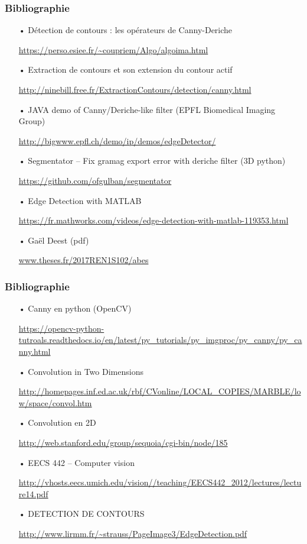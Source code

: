 \documentclass{beamer}
\begin{document}
\begin{frame}
\frametitle{Bibliographie}
	
\begin{itemize}
\item[•] Détection de contours : les opérateurs de Canny-Deriche
\item[] \url{https://perso.esiee.fr/~coupriem/Algo/algoima.html} 

\item[•] Extraction de contours et son extension du contour actif
\item[]
\url{http://ninebill.free.fr/ExtractionContours/detection/canny.html}

\item[•] JAVA demo of Canny/Deriche-like filter (EPFL Biomedical Imaging Group)
\item[] \url{http://bigwww.epfl.ch/demo/ip/demos/edgeDetector/} 

\item[•] Segmentator \--- Fix gramag export error with deriche filter (3D python)
\item[] \url{https://github.com/ofgulban/segmentator} 

\item[•] Edge Detection with MATLAB
\item[] \url{https://fr.mathworks.com/videos/edge-detection-with-matlab-119353.html} 

\item[•] Gaël Deest (pdf)
\item[] \url{www.theses.fr/2017REN1S102/abes} 
\end{itemize}
\end{frame}

\begin{frame}
\frametitle{Bibliographie}
	
\begin{itemize}

\item[•] Canny en python (OpenCV)
\item[] \url{https://opencv-python-tutroals.readthedocs.io/en/latest/py_tutorials/py_imgproc/py_canny/py_canny.html} 

\item[•] Convolution in Two Dimensions
\item[] \url{http://homepages.inf.ed.ac.uk/rbf/CVonline/LOCAL_COPIES/MARBLE/low/space/convol.htm} 

\item[•] Convolution en 2D
\item[] \url{http://web.stanford.edu/group/sequoia/cgi-bin/node/185} 

\item[•] EECS 442 \--- Computer vision
\item[] \url{http://vhosts.eecs.umich.edu/vision//teaching/EECS442_2012/lectures/lecture14.pdf} 

\item[•] DETECTION DE CONTOURS
\item[] \url{http://www.lirmm.fr/~strauss/PageImage3/EdgeDetection.pdf}
\end{itemize}
\end{frame}
\end{document}
